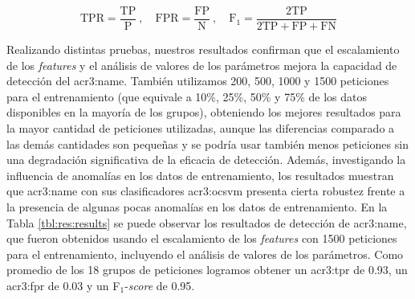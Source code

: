 \begin{equation}
    \label{eq:res:scores2}
    \text{TPR} = \frac{\text{TP}}{\text{P}}
    \ , \quad
    \text{FPR} = \frac{\text{FP}}{\text{N}}
    \ , \quad
    \text{F}_{1} = \frac{2 \text{TP}}{2 \text{TP} + \text{FP} + \text{FN}}
\end{equation}

Realizando distintas pruebas, nuestros resultados confirman que el
escalamiento de los \textit{features} y el análisis de valores de los
parámetros mejora la capacidad de detección del \gls{acr3:name}.
También utilizamos 200, 500, \num{1000} y \num{1500} peticiones para el entrenamiento
(que equivale a 10\%, 25\%, 50\% y 75\% de los datos disponibles en la
mayoría de los grupos), obteniendo los mejores resultados para la mayor
cantidad de peticiones utilizadas, aunque las diferencias comparado a las
demás cantidades son pequeñas y se podría usar también menos peticiones
sin una degradación significativa de la eficacia de detección.
Además, investigando la influencia de anomalías en los datos de entrenamiento,
los resultados muestran que
\gls{acr3:name} con sus clasificadores \gls{acr3:ocsvm} presenta cierta
robustez frente a la presencia de algunas pocas anomalías en los datos
de entrenamiento.
En la Tabla \ref{tbl:res:results} se puede observar los resultados de detección
de \gls{acr3:name}, que fueron obtenidos usando el escalamiento de los
\textit{features} con \num{1500} peticiones para el entrenamiento,
incluyendo el análisis de valores de los parámetros.
Como promedio de los 18 grupos de peticiones logramos obtener un \gls{acr3:tpr} de \num{0.93},
un \gls{acr3:fpr} de \num{0.03} y un F$_{1}$-\textit{score} de \num{0.95}.

